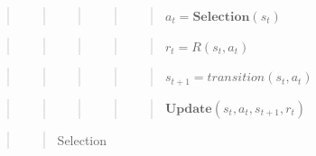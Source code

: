 \documentclass[10pt,a4paper,onecolumn]{article}
\begin{document}
\begin{quote}
\begin{quote}
\begin{quote}
\begin{quote}
\begin{quote}
\(a_t = \textbf{Selection}(s_t)\)
\end{quote}
\end{quote}
\end{quote}
\end{quote}
\end{quote}

\begin{quote}
\begin{quote}
\begin{quote}
\begin{quote}
\begin{quote}
\(r_t = R(s_t,a_t)\)
\end{quote}
\end{quote}
\end{quote}
\end{quote}
\end{quote}

\begin{quote}
\begin{quote}
\begin{quote}
\begin{quote}
\begin{quote}
\(s_{t+1} = transition(s_t, a_t)\)
\end{quote}
\end{quote}
\end{quote}
\end{quote}
\end{quote}

\begin{quote}
\begin{quote}
\begin{quote}
\begin{quote}
\begin{quote}
\(\textbf{Update}(s_t,a_t, s_{t+1}, r_t)\)
\end{quote}
\end{quote}
\end{quote}
\end{quote}
\end{quote}

\begin{quote}
\begin{quote}
Selection
\end{quote}
\end{quote}
\end{document}
